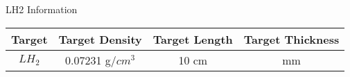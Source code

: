 \begin{Mtable}{LH2 Information}
  \centering
  \begin{tabular}{|c|c|c|c|}
    \hline
    \textbf{Target} & \textbf{Target Density} & \textbf{Target Length} & \textbf{Target Thickness} \\
    \hline
    $LH_2$ & 0.07231 g/$cm^3$ & 10 cm & mm \\
    \hline
    \end{tabular}
  \label{tab:2-3_lh2_properties}
\end{Mtable}

